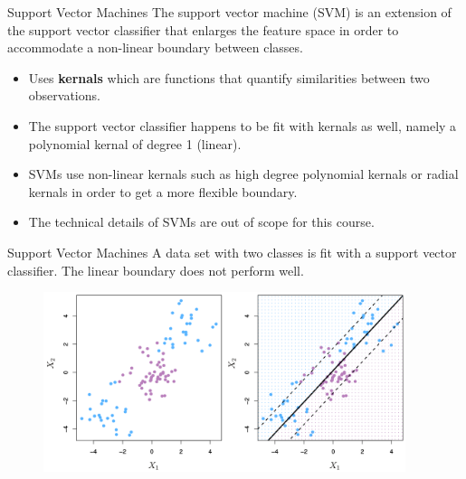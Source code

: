 \documentclass[
  ignorenonframetext,
  aspectratio=169,
]{beamer}
\begin{document}
\begin{frame}{Support Vector Machines}
\protect\hypertarget{support-vector-machines}{}
The support vector machine (SVM) is an extension of the support vector
classifier that
\alert{enlarges the feature space in order to accommodate a non-linear boundary}
between classes.

\begin{itemize}
\item
  Uses \textbf{kernals} which are functions that quantify similarities
  between two observations.
\item
  The support vector classifier happens to be fit with kernals as well,
  namely a polynomial kernal of degree 1 (linear).
\item
  SVMs use non-linear kernals such as high degree polynomial kernals or
  radial kernals in order to get a more flexible boundary.
\item
  The technical details of SVMs are out of scope for this course.
\end{itemize}
\end{frame}

\begin{frame}{Support Vector Machines}
\protect\hypertarget{support-vector-machines-1}{}
A data set with two classes is fit with a support vector classifier. The
linear boundary does not perform well.

\begin{figure}

{\centering \includegraphics[width=4.16667in,height=\textheight]{images/SVCpoor.png}

}

\end{figure}
\end{frame}
\end{document}
